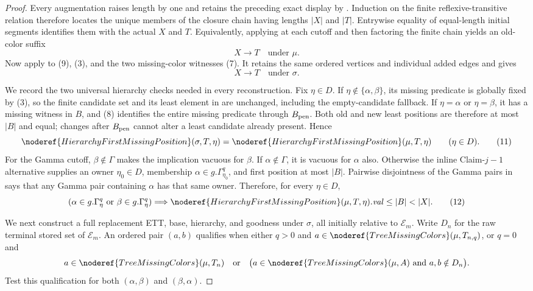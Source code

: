 \begin{proof}
Every augmentation raises length by one and retains the preceding exact
display by .  Induction on the finite
reflexive-transitive relation
 therefore locates the unique
members of the closure chain having lengths \(|X|\) and \(|T|\).
Entrywise equality of equal-length initial segments identifies them with
the actual \(X\) and \(T\).  Equivalently, applying
 at each cutoff and then
factoring the finite chain yields an old-color suffix
\[
                 X\longrightarrow T\quad\text{under }\mu.      \tag{9}
\]
Now apply
 to (9), (3), and
the two missing-color witnesses (7).  It retains the same ordered
vertices and individual added edges and gives
\[
                 X\longrightarrow T\quad\text{under }\sigma.  \tag{10}
\]

We record the two universal hierarchy checks needed in every
reconstruction.  Fix \(\eta\in D\).  If
\(\eta\notin\{\alpha,\beta\}\), its missing predicate is globally fixed
by (3), so the finite candidate set and its least element in
 are unchanged, including the
empty-candidate fallback.  If \(\eta=\alpha\) or \(\eta=\beta\), it has
a missing witness in \(B\), and (8) identifies the entire missing
predicate through \(B_{\rm pen}\).  Both old and new least positions are
therefore at most \(|B|\) and equal; changes after \(B_{\rm pen}\) cannot
alter a least candidate already present.  Hence
\[
 \noderef{HierarchyFirstMissingPosition}(\sigma,T,\eta)
 =\noderef{HierarchyFirstMissingPosition}(\mu,T,\eta)
                       \qquad(\eta\in D).                     \tag{11}
\]
For the Gamma cutoff, \(\beta\notin\Gamma\) makes the implication
vacuous for \(\beta\).  If \(\alpha\notin\Gamma\), it is vacuous for
\(\alpha\) also.  Otherwise the inline Claim-\(j-1\) alternative supplies
an owner \(\eta_0\in D\), membership
\(\alpha\in g.\Gamma^q_{\eta_0}\), and first position at most \(|B|\).
Pairwise disjointness of the Gamma pairs in
 says that any Gamma pair containing \(\alpha\)
has that same owner.  Therefore, for every \(\eta\in D\),
\[
 (\alpha\in g.\Gamma^q_\eta\text{ or }
   \beta\in g.\Gamma^q_\eta)
 \Longrightarrow
 \noderef{HierarchyFirstMissingPosition}(\mu,T,\eta).\mathit{val}
       \le |B|<|X|.                                           \tag{12}
\]

We next construct a full replacement ETT, base, hierarchy, and goodness
under \(\sigma\), all initially relative to \(\mathcal E_m\).  Write
\(D_n\) for the raw terminal stored set of \(\mathcal E_m\).
An ordered pair \((a,b)\) qualifies when either \(q>0\) and
\(a\in\noderef{TreeMissingColors}(\mu,T_{n,q})\), or \(q=0\) and
\[
 a\in\noderef{TreeMissingColors}(\mu,T_n)
 \quad\text{or}\quad
 \bigl(a\in\noderef{TreeMissingColors}(\mu,A)
       \text{ and }a,b\notin D_n\bigr).
\]
Test this qualification for both \((\alpha,\beta)\) and
\((\beta,\alpha)\).


\end{proof}
